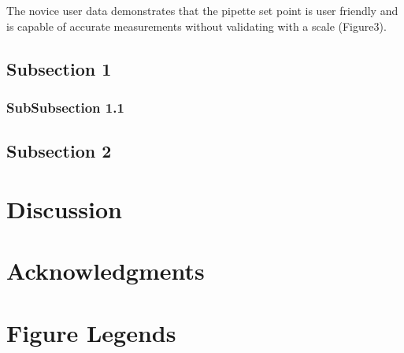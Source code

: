 The novice user data demonstrates that the pipette set point is user friendly and is capable of accurate measurements without validating with a scale (Figure3).
\subsection*{Subsection 1}

\subsubsection*{SubSubsection 1.1}

\subsection*{Subsection 2}

\section*{Discussion}




\section*{Acknowledgments}





%
%
% 

\section*{Figure Legends}
%

